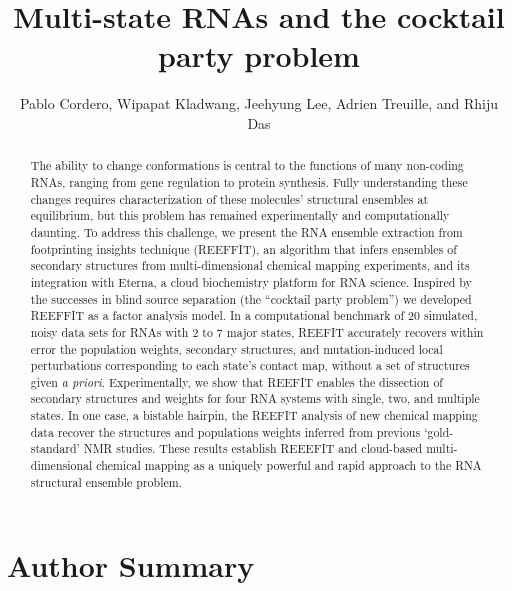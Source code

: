\documentclass[12pt]{article}
\title{Multi-state RNAs and the cocktail party problem}
\author{Pablo Cordero, Wipapat Kladwang, Jeehyung Lee, Adrien Treuille, and Rhiju Das}
\begin{document}
\maketitle

\begin{abstract}
The ability to change conformations is central to the functions of many non-coding RNAs, ranging from gene regulation to protein synthesis. 
Fully understanding these changes requires characterization of these molecules' structural ensembles at equilibrium, but this problem has remained experimentally and computationally daunting. 
To address this challenge, we present the RNA ensemble extraction from footprinting insights technique (REEFFIT), an algorithm that infers ensembles of secondary structures from multi-dimensional chemical mapping experiments, and its integration with Eterna, a cloud biochemistry platform for RNA science. 
Inspired by the successes in blind source separation (the ``cocktail party problem'') we developed REEFFIT as a factor analysis model. 
In a computational benchmark of 20 simulated, noisy data sets for RNAs with 2 to 7 major states, REEFIT accurately recovers within error the population weights, secondary structures, and mutation-induced local perturbations corresponding to each state's contact map, without a set of structures given \textit{a priori}. 
Experimentally, we show that REEFIT enables the dissection of secondary structures and weights for four RNA systems with single, two, and multiple states. 
In one case, a bistable hairpin, the REEFIT analysis of new chemical mapping data recover the structures and populations weights inferred from previous `gold-standard' NMR studies. 
These results establish REEEFIT and cloud-based multi-dimensional chemical mapping as a uniquely powerful and rapid approach to the RNA structural ensemble problem.
\end{abstract}

\section{Author Summary}
\end{document}
